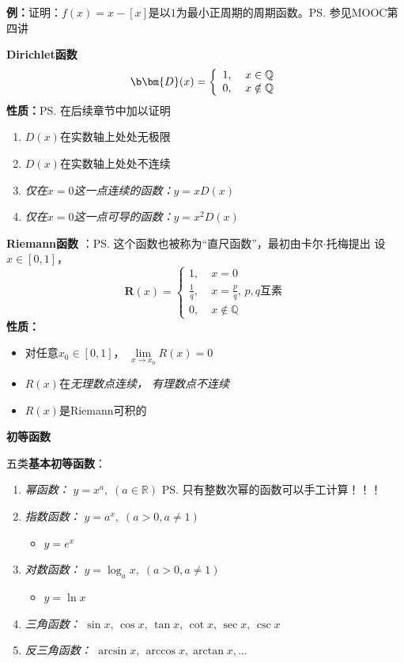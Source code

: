 {\bf 例：}证明：$f(x)=x-[x]$是以$1$为最小正周期的周期函数。\ps{参见MOOC第四讲}

{\bf Dirichlet函数}
  $${\b \bm{D}(x) =\left\{
  \begin{array}{ll}
  	1,\;& x\in\mathbb{Q} \\
  	0,\;& x\notin\mathbb{Q}
  \end{array}
  \right.}$$
  {\bf 性质：}\ps{在后续章节中加以证明}
  \begin{enumerate}[(1)]
    \setlength{\itemindent}{1cm}
    \item $D(x)$在实数轴上处处无极限
	\item $D(x)$在实数轴上处处不连续
	\item {\it 仅在$x=0$这一点连续的函数：}$y=xD(x)$
	\item {\it 仅在$x=0$这一点可导的函数：}$y=x^2D(x)$
  \end{enumerate}

{\bf Riemann函数} ：\ps{这个函数也被称为“直尺函数”，最初由卡尔$\cdot$托梅提出}
设$x\in[0,1]$，
  $$\bm{R}(x) =\left\{
	\begin{array}{ll}
	1,\;&x=0\\
	\displaystyle\frac 1q,\;&x=\displaystyle\frac pq,\,p,q\mbox{互素}\\
	0,\;&x\notin\mathbb{Q}
	\end{array}
  \right. $$
  {\bf 性质：}
  \begin{itemize}
    \item 对任意$x_0\in[0,1]$， $\lim\limits_{x\to x_0}R(x)=0$
    \vspace{1ex}
    \item $R(x)$在{\it 无理数点连续， 有理数点不连续}
    \item $R(x)$是Riemann可积的
  \end{itemize}

{\bf 初等函数}

五类{\bf 基本初等函数}：

\begin{enumerate}
  \setlength{\itemindent}{1cm}
  \item {\it 幂函数：} $y=x^a,\; (a\in\mathbb{R})$
  \ps{只有整数次幂的函数可以手工计算！！！}
  \item {\it 指数函数：} $y=a^x,\; (a>0,a\ne 1)$
  \begin{itemize}
    \item {$y=e^x$}
  \end{itemize}
  \item {\it 对数函数：} $y=\log_ax,\; (a>0,a\ne 1)$
  \begin{itemize}
    \item {$y=\ln x$}
  \end{itemize}
  \item {\it 三角函数：} $\sin x, \,\cos x,\, \tan x, \,\cot
  x,\, \sec x,\, \csc x$
  \item {\it 反三角函数：} $\arcsin x, \,\arccos x, \arctan x,
  \ldots$
\end{enumerate}

